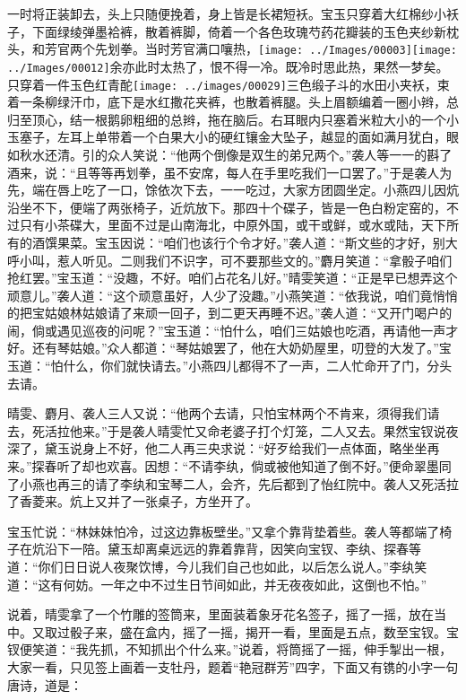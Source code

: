 一时将正装卸去，头上只随便挽着，身上皆是长裙短袄。宝玉只穿着大红棉纱小袄子，下面绿绫弹墨袷裤，散着裤脚，倚着一个各色玫瑰芍药花瓣装的玉色夹纱新枕头，和芳官两个先划拳。当时芳官满口嚷热，{\texttt{[image: ../Images/00003]}\texttt{[image: ../Images/00012]}\footnotesize \kaishu 余亦此时太热了，恨不得一冷。既冷时思此热，果然一梦矣。}只穿着一件玉色红青酡\texttt{[image: ../images/00029]}三色缎子斗的水田小夹袄，束着一条柳绿汗巾，底下是水红撒花夹裤，也散着裤腿。头上眉额编着一圈小辫，总归至顶心，结一根鹅卵粗细的总辫，拖在脑后。右耳眼内只塞着米粒大小的一个小玉塞子，左耳上单带着一个白果大小的硬红镶金大坠子，越显的面如满月犹白，眼如秋水还清。引的众人笑说：``他两个倒像是双生的弟兄两个。''袭人等一一的斟了酒来，说：``且等等再划拳，虽不安席，每人在手里吃我们一口罢了。''于是袭人为先，端在唇上吃了一口，馀依次下去，一一吃过，大家方团圆坐定。小燕四儿因炕沿坐不下，便端了两张椅子，近炕放下。那四十个碟子，皆是一色白粉定窑的，不过只有小茶碟大，里面不过是山南海北，中原外国，或干或鲜，或水或陆，天下所有的酒馔果菜。宝玉因说：``咱们也该行个令才好。''袭人道：``斯文些的才好，别大呼小叫，惹人听见。二则我们不识字，可不要那些文的。''麝月笑道：``拿骰子咱们抢红罢。''宝玉道：``没趣，不好。咱们占花名儿好。''晴雯笑道：``正是早已想弄这个顽意儿。''袭人道：``这个顽意虽好，人少了没趣。''小燕笑道：``依我说，咱们竟悄悄的把宝姑娘林姑娘请了来顽一回子，到二更天再睡不迟。''袭人道：``又开门喝户的闹，倘或遇见巡夜的问呢？''宝玉道：``怕什么，咱们三姑娘也吃酒，再请他一声才好。还有琴姑娘。''众人都道：``琴姑娘罢了，他在大奶奶屋里，叨登的大发了。''宝玉道：``怕什么，你们就快请去。''小燕四儿都得不了一声，二人忙命开了门，分头去请。

晴雯、麝月、袭人三人又说：``他两个去请，只怕宝林两个不肯来，须得我们请去，死活拉他来。''于是袭人晴雯忙又命老婆子打个灯笼，二人又去。果然宝钗说夜深了，黛玉说身上不好，他二人再三央求说：``好歹给我们一点体面，略坐坐再来。''探春听了却也欢喜。因想：``不请李纨，倘或被他知道了倒不好。''便命翠墨同了小燕也再三的请了李纨和宝琴二人，会齐，先后都到了怡红院中。袭人又死活拉了香菱来。炕上又并了一张桌子，方坐开了。

宝玉忙说：``林妹妹怕冷，过这边靠板壁坐。''又拿个靠背垫着些。袭人等都端了椅子在炕沿下一陪。黛玉却离桌远远的靠着靠背，因笑向宝钗、李纨、探春等道：``你们日日说人夜聚饮博，今儿我们自己也如此，以后怎么说人。''李纨笑道：``这有何妨。一年之中不过生日节间如此，并无夜夜如此，这倒也不怕。''

说着，晴雯拿了一个竹雕的签筒来，里面装着象牙花名签子，摇了一摇，放在当中。又取过骰子来，盛在盒内，摇了一摇，揭开一看，里面是五点，数至宝钗。宝钗便笑道：``我先抓，不知抓出个什么来。''说着，将筒摇了一摇，伸手掣出一根，大家一看，只见签上画着一支牡丹，题着``艳冠群芳''四字，下面又有镌的小字一句唐诗，道是：

